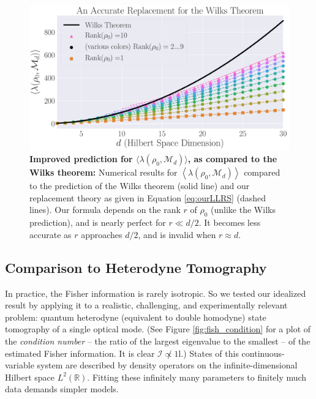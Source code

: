 \documentclass[aps,pra, twocolumn]{revtex4-1}
\newcommand{\M}{\mathcal{M}}
\newcommand{\reals}{\mathbb{R}}
\newcommand{\Id}{\mathbb{I}}
\newcommand{\expect}[1]{\ensuremath{\left\langle#1\right\rangle}}
\def\Id{1\!\mathrm{l}}
\begin{document}
\begin{figure}
 \includegraphics[width=\columnwidth]{Images/Figure_9.pdf}
 \caption{\textbf{Improved prediction for $\langle \lambda(\rho_{0}, \M_{d})\rangle$, as compared to the Wilks theorem:} Numerical results for $\expect{\lambda(\rho_{0}, \M_{d})}$ compared to the prediction of the Wilks theorem (solid line) and our replacement theory as given in Equation \eqref{eq:ourLLRS} (dashed lines).  Our formula depends on the rank $r$ of $\rho_0$ (unlike the Wilks prediction), and is nearly perfect for $r\ll d/2$.  It becomes less accurate as $r$ approaches $d/2$, and is invalid when $r\approx d$.}
 \label{fig:modelcomp-iso}
\end{figure}

\subsection{Comparison to Heterodyne Tomography}
\label{sec:heterotomo}
In practice, the Fisher information is rarely isotropic.  So we tested our idealized result by applying it to a realistic, challenging, and experimentally relevant problem: quantum heterodyne (equivalent to double homodyne) state tomography \cite{Lvovsky2001a, Bertrand1987, Leonhardt1995, Lvovsky2009} of a single optical mode.  (See Figure \ref{fig:fish_condition} for a plot of the \emph{condition number} -- the ratio of the largest eigenvalue to the smallest -- of the estimated Fisher information. It is clear $\mathcal{I} \not \propto \Id$.) States of this continuous-variable system are described by density operators on the infinite-dimensional Hilbert space $L^2(\reals)$.  Fitting these infinitely many parameters to finitely much data demands simpler models.
\end{document}
